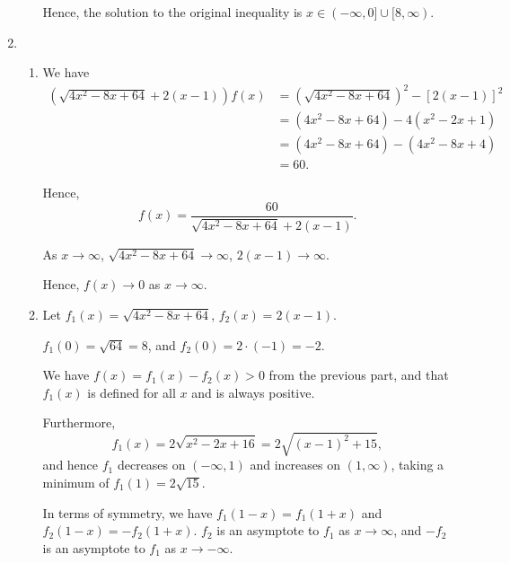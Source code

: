 \begin{enumerate}
\begin{enumerate}
                    Hence, the solution to the original inequality is \(x \in (-\infty, 0] \cup [8, \infty)\).
          \end{enumerate}

    \item \begin{enumerate}
              \item We have
                    \begin{align*}
                        \left(\sqrt{4x^2 - 8x + 64} + 2(x - 1)\right)f(x) & = \left(\sqrt{4x^2 - 8x + 64}\right)^2 - [2 (x - 1)]^2      \\
                                                                          & = \left(4x^2 - 8x + 64\right) - 4 \left(x^2 - 2x + 1\right) \\
                                                                          & = \left(4x^2 - 8x + 64\right) - \left(4x^2 - 8x + 4\right)  \\
                                                                          & = 60.
                    \end{align*}

                    Hence,
                    \[
                        f(x) = \frac{60}{\sqrt{4x^2 - 8x + 64} + 2 (x - 1)}.
                    \]

                    As \(x \to \infty\), \(\sqrt{4x^2 - 8x + 64} \to \infty\), \(2 (x - 1) \to \infty\).

                    Hence, \(f(x) \to 0\) as \(x \to \infty\).

              \item Let \(f_1(x) = \sqrt{4x^2 - 8x + 64}\), \(f_2(x) = 2 (x - 1)\).

                    \(f_1(0) = \sqrt{64} = 8\), and \(f_2(0) = 2 \cdot (-1) = -2\).

                    We have \(f(x) = f_1(x) - f_2(x) > 0\) from the previous part, and that \(f_1(x)\) is defined for all \(x\) and is always positive.

                    Furthermore,
                    \[
                        f_1(x) = 2 \sqrt{x^2 - 2x + 16} = 2 \sqrt{(x - 1)^2 + 15},
                    \]
                    and hence \(f_1\) decreases on \((-\infty, 1)\) and increases on \((1, \infty)\), taking a minimum of \(f_1(1) = 2 \sqrt{15}\).

                    In terms of symmetry, we have \(f_1(1 - x) = f_1(1 + x)\) and \(f_2(1 - x) = - f_2(1 + x)\). \(f_2\) is an asymptote to \(f_1\) as \(x \to \infty\), and \(-f_2\) is an asymptote to \(f_1\) as \(x \to -\infty\).


\end{enumerate}
\end{enumerate}
